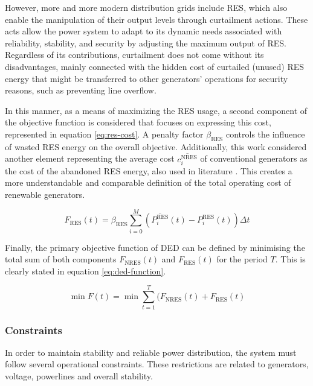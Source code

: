 However, more and more modern distribution grids include \acf{RES}, which also enable the manipulation of their output levels through curtailment actions. These acts allow the power system to adapt to its dynamic needs associated with reliability, stability, and security by adjusting the maximum output of \ac{RES}. Regardless of its contributions, curtailment does not come without its disadvantages, mainly connected with the hidden cost of curtailed (unused) \ac{RES} energy that might be transferred to other generators' operations for security reasons, such as preventing line overflow. \par

In this manner, as a means of maximizing the \ac{RES} usage, a second component of the objective function is considered that focuses on expressing this cost, represented in equation \ref{eq:res-cost}. A penalty factor $\beta_\text{RES}$ controls the influence of wasted \ac{RES} energy on the overall objective. Additionally, this work considered another element representing the average cost $\overline{c^\text{NRES}_i}$ of conventional generators as the cost of the abandoned \ac{RES} energy, also used in literature \cite{chenScalableGraphReinforcement2023, liNovelGraphReinforcement2022, liNovelGraphReinforcement2022}. This creates a more understandable and comparable definition of the total operating cost of renewable generators.  \par

\begin{equation} \label{eq:res-cost}
	F_\text{RES}(t) = \beta_\text{RES} \sum^M_{i=0}  (\overline{P^\text{RES}_i}(t) - P^\text{RES}_i(t)) \Delta t 
\end{equation}

Finally, the primary objective function of \ac{DED} can be defined by minimising the total sum of both components $F_\text{NRES}(t)$ and $F_\text{RES}(t)$ for the period $T$. This is clearly stated in equation \ref{eq:ded-function}.

\begin{equation} \label{eq:ded-function}
	\min F (t) =  \min\sum^T_{t=1}(F_\text{NRES}(t) + F_{\text{RES}}(t)
\end{equation}

\subsubsection{Constraints} \label{sec:constraints}

In order to maintain stability and reliable power distribution, the system must follow several operational constraints. These restrictions are related to generators, voltage, powerlines and overall stability.  \par

